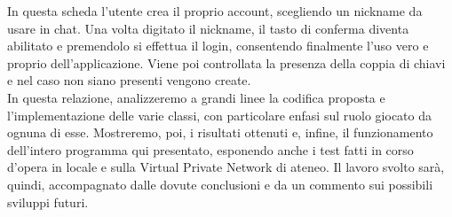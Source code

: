 In questa scheda l'utente crea il proprio account, scegliendo un nickname da usare in chat.
Una volta digitato il nickname, il tasto di conferma diventa abilitato e premendolo si effettua
il login, consentendo finalmente l'uso vero e proprio dell'applicazione.
Viene poi controllata la presenza della coppia di chiavi e nel caso non siano presenti vengono create.
\\

In questa relazione, analizzeremo a grandi linee la codifica proposta e l'implementazione
delle varie classi, con particolare enfasi sul ruolo giocato da ognuna di esse.
Mostreremo, poi, i risultati ottenuti e, infine,
il funzionamento dell'intero programma qui presentato,
esponendo anche i test fatti in corso d'opera
in locale e sulla Virtual Private Network di ateneo.
Il lavoro svolto sarà, quindi, accompagnato dalle dovute conclusioni e
da un commento sui possibili sviluppi futuri.